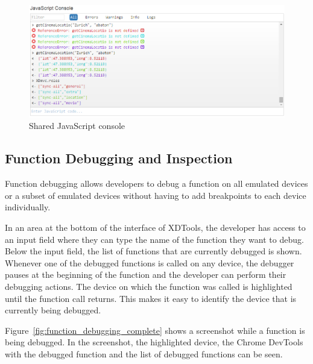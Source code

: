 \begin{figure}[H]
  \centering
    \includegraphics[width=1.0\textwidth]{images/screenshots/js_console_2.png}
	\caption[Screenshot: JavaScript console]{Shared JavaScript console}
	\label{fig:js_console}
\end{figure}

\subsection{Function Debugging and Inspection}

Function debugging allows developers to debug a function on all emulated devices or a subset of emulated devices without having to add breakpoints to each device individually.

In an area at the bottom of the interface of XDTools, the developer has access to an input field where they can type the name of the function they want to debug.  Below the input field, the list of functions that are currently debugged is shown. Whenever one of the debugged functions is called on any device, the debugger pauses at the beginning of the function and the developer can perform their debugging actions. The device on which the function was called is highlighted until the function call returns. This makes it easy to identify the device that is currently being debugged.

Figure~\ref{fig:function_debugging_complete} shows a screenshot while a function is being debugged. In the screenshot, the highlighted device, the Chrome DevTools with the debugged function and the list of debugged functions can be seen.

